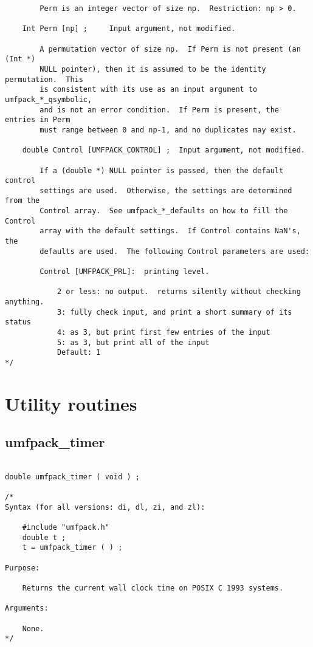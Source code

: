 \documentclass[11pt]{article}
\begin{document}
{\begin{verbatim}
        Perm is an integer vector of size np.  Restriction: np > 0.

    Int Perm [np] ;     Input argument, not modified.

        A permutation vector of size np.  If Perm is not present (an (Int *)
        NULL pointer), then it is assumed to be the identity permutation.  This
        is consistent with its use as an input argument to umfpack_*_qsymbolic,
        and is not an error condition.  If Perm is present, the entries in Perm
        must range between 0 and np-1, and no duplicates may exist.

    double Control [UMFPACK_CONTROL] ;  Input argument, not modified.

        If a (double *) NULL pointer is passed, then the default control
        settings are used.  Otherwise, the settings are determined from the
        Control array.  See umfpack_*_defaults on how to fill the Control
        array with the default settings.  If Control contains NaN's, the
        defaults are used.  The following Control parameters are used:

        Control [UMFPACK_PRL]:  printing level.

            2 or less: no output.  returns silently without checking anything.
            3: fully check input, and print a short summary of its status
            4: as 3, but print first few entries of the input
            5: as 3, but print all of the input
            Default: 1
*/
\end{verbatim}
}

\newpage
\section{Utility routines}
\label{Utility}

\subsection{umfpack\_timer}

{\footnotesize
\begin{verbatim}

double umfpack_timer ( void ) ;

/*
Syntax (for all versions: di, dl, zi, and zl):

    #include "umfpack.h"
    double t ;
    t = umfpack_timer ( ) ;

Purpose:

    Returns the current wall clock time on POSIX C 1993 systems.

Arguments:

    None.
*/
\end{verbatim}
}
\end{document}
